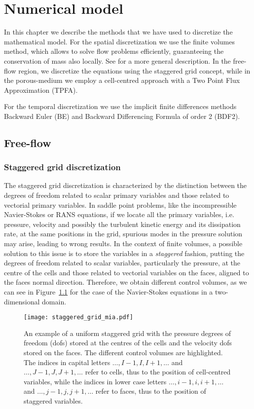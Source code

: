 \chapter{Numerical model} \label{chap:discretization} %
In this chapter we describe the methods that we have used to discretize the mathematical model. 
For the spatial discretization we use the finite volumes method, which allows 
to solve flow problems efficiently, guaranteeing the conservation of mass also locally. See 
\cite{fv:leveque} for a more general description.
In the free-flow region, we discretize the equations using the staggered grid 
concept, while in the porous-medium we employ a cell-centred approach with a 
Two Point Flux Approximation (TPFA).

For the temporal discretization we use the implicit finite differences methods 
Backward Euler (BE) and Backward Differencing Formula of order 2 (BDF2).
%
\section{Free-flow}
\subsection{Staggered grid discretization}
The staggered grid discretization is characterized by the distinction between 
the degrees of freedom related to scalar primary variables and those related to 
vectorial primary variables. In saddle point problems, like the incompressible 
Navier-Stokes or RANS equations, if we locate all the primary variables, i.e. 
pressure, velocity and possibly the turbulent kinetic energy and its 
dissipation rate, at the same positions in the grid, spurious modes in the 
pressure solution may arise, leading to wrong results. In the context of finite 
volumes, a possible solution to 
this issue 
is to store the variables in a \emph{staggered} fashion, putting 
the degrees of freedom related to scalar variables, particularly the 
pressure, at the centre of the cells 
and those related to vectorial variables on the faces, aligned to the faces 
normal direction. Therefore, we obtain different control volumes, as we can see 
in Figure~\ref{fig:staggrid} for the case of the 
Navier-Stokes equations in a two-dimensional domain.
\begin{figure}[t]
	\centering
	\texttt{[image: staggered\_grid\_mia.pdf]}
	\caption[Staggered grid control volumes]{An example of a uniform staggered 
	grid with the pressure degrees of freedom (dofs) stored at the centres of 
	the cells and the velocity dofs stored on the faces. The different control 
	volumes are highlighted. The indices in capital letters $\dots, I-1, I, 
	I+1, \dots$ and $\dots, J-1, J, J+1, \dots$ refer to cells, thus to the 
	position of cell-centred variables, while the indices in lower case letters 
	$\dots, i-1, i, i+1, \dots$ and $\dots,j-1,j,j+1,\dots$ refer to faces, 
	thus to the position of staggered variables.}
	\label{fig:staggrid}
\end{figure}

